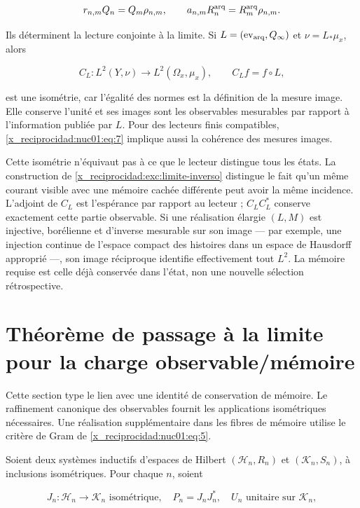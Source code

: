 \begin{equation}
r_{n,m}Q_n=Q_m\rho_{n,m},\qquad
a_{n,m}R^{\rm arq}_n=R^{\rm arq}_m\rho_{n,m}.
\label{x_reciprocidad:nuc01:eq:7}
\end{equation}

Ils déterminent la lecture conjointe à la limite. Si \(L=(\operatorname{ev}_{\rm arq},Q_\infty)\) et \(\nu=L_*\mu_x\), alors

\[
C_L:L^2(Y,\nu)\longrightarrow L^2(\Omega_x,\mu_x),
\qquad C_Lf=f\circ L,
\]

est une isométrie, car l’égalité des normes est la définition de la mesure image. Elle conserve l’unité et ses images sont les observables mesurables par rapport à l’information publiée par \(L\). Pour des lecteurs finis compatibles, \eqref{x_reciprocidad:nuc01:eq:7} implique aussi la cohérence des mesures images.

Cette isométrie n’équivaut pas à ce que le lecteur distingue tous les états. La construction de \cref{x_reciprocidad:exc:limite-inverso} distingue le fait qu’un même courant visible avec une mémoire cachée différente peut avoir la même incidence. L’adjoint de \(C_L\) est l’espérance par rapport au lecteur ; \(C_LC_L^*\) conserve exactement cette partie observable. Si une réalisation élargie \((L,M)\) est injective, borélienne et d’inverse mesurable sur son image — par exemple, une injection continue de l’espace compact des histoires dans un espace de Hausdorff approprié —, son image réciproque identifie effectivement tout \(L^2\). La mémoire requise est celle déjà conservée dans l’état, non une nouvelle sélection rétrospective.

\section{Théorème de passage à la limite pour la charge observable/mémoire}

Cette section type le lien avec une identité de conservation de mémoire. Le raffinement canonique des observables fournit les applications isométriques nécessaires. Une réalisation supplémentaire dans les fibres de mémoire utilise le critère de Gram de \eqref{x_reciprocidad:nuc01:eq:5}.

Soient deux systèmes inductifs d’espaces de Hilbert \((\mathscr H_n,R_n)\) et \((\mathscr K_n,S_n)\), à inclusions isométriques. Pour chaque \(n\), soient

\[
J_n:\mathscr H_n\to\mathscr K_n\text{ isométrique},\quad
P_n=J_nJ_n^*,\quad U_n\text{ unitaire sur }\mathscr K_n,
\]

